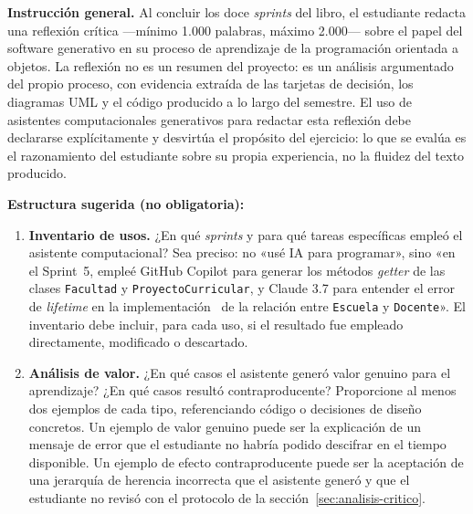 \begin{tcolorbox}[actividadIA,
  title={Actividad final de reflexión (Sprint~12) ---
         Software generativo y aprendizaje de la \poo}]

\textbf{Instrucción general.}
Al concluir los doce \textit{sprints} del libro, el estudiante redacta una
reflexión crítica ---mínimo 1.000 palabras, máximo 2.000--- sobre el papel
del software generativo en su proceso de aprendizaje de la programación
orientada a objetos. La reflexión no es un resumen del proyecto: es un
análisis argumentado del propio proceso, con evidencia extraída de las
tarjetas de decisión, los diagramas UML y el código producido a lo largo
del semestre. El uso de asistentes computacionales generativos para redactar
esta reflexión debe declararse explícitamente y desvirtúa el propósito del
ejercicio: lo que se evalúa es el razonamiento del estudiante sobre su propia
experiencia, no la fluidez del texto producido.

\bigskip
\textbf{Estructura sugerida (no obligatoria):}

\begin{enumerate}[label=\textbf{\arabic*.}]
  \item \textbf{Inventario de usos.}
        ¿En qué \textit{sprints} y para qué tareas específicas empleó el
        asistente computacional? Sea preciso: no «usé IA para programar»,
        sino «en el Sprint~5, empleé GitHub Copilot para generar los métodos
        \textit{getter} de las clases \texttt{Facultad} y \texttt{ProyectoCurricular},
        y Claude 3.7 para entender el error de \textit{lifetime} en la
        implementación \rust\ de la relación entre \texttt{Escuela} y
        \texttt{Docente}». El inventario debe incluir, para cada uso, si
        el resultado fue empleado directamente, modificado o descartado.

  \item \textbf{Análisis de valor.}
        ¿En qué casos el asistente generó valor genuino para el aprendizaje?
        ¿En qué casos resultó contraproducente? Proporcione al menos dos
        ejemplos de cada tipo, referenciando código o decisiones de diseño
        concretos. Un ejemplo de valor genuino puede ser la explicación de
        un mensaje de error que el estudiante no habría podido descifrar
        en el tiempo disponible. Un ejemplo de efecto contraproducente puede
        ser la aceptación de una jerarquía de herencia incorrecta que el
        asistente generó y que el estudiante no revisó con el protocolo
        de la sección~\ref{sec:analisis-critico}.


\end{enumerate}
\end{tcolorbox}
